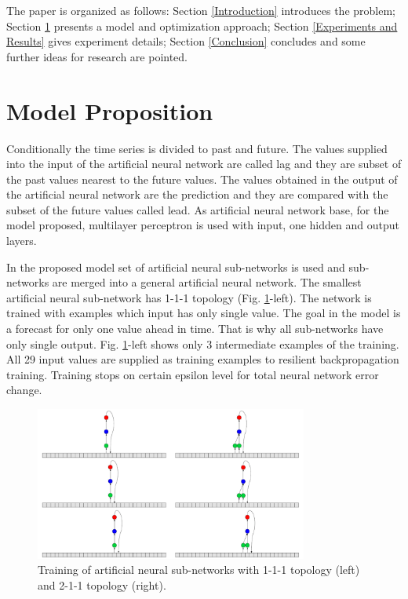 \documentclass[11pt]{article}
\begin{document}
The paper is organized as follows: Section \ref{Introduction} introduces the problem; Section \ref{Model Proposition} presents a model and optimization approach; Section \ref{Experiments and Results} gives experiment details; Section \ref{Conclusion} concludes and some further ideas for research are pointed.

\section{Model Proposition} \label{Model Proposition}

Conditionally the time series is divided to past and future. The values supplied into the input of the artificial neural network are called lag and they are subset of the past values nearest to the future values. The values obtained in the output of the artificial neural network are the prediction and they are compared with the subset of the future values called lead. As artificial neural network base, for the model proposed, multilayer perceptron is used with input, one hidden and output layers. 

In the proposed model set of artificial neural sub-networks is used and sub-networks are merged into a general artificial neural network. The smallest artificial neural sub-network has 1-1-1 topology (Fig. \ref{fig:pic01}-left). The network is trained with examples which input has only single value. The goal in the model is a forecast for only one value ahead in time. That is why all sub-networks have only single output. Fig. \ref{fig:pic01}-left shows only 3 intermediate examples of the training. All 29 input values are supplied as training examples to resilient backpropagation training. Training stops on certain epsilon level for total neural network error change.

\begin{figure}[ht!]
   \centering
     \includegraphics[width=0.8\textwidth]{pic01}
    \caption {Training of artificial neural sub-networks with 1-1-1 topology (left) and 2-1-1 topology (right).}
\label{fig:pic01}
\end{figure}
\FloatBarrier
\end{document}
